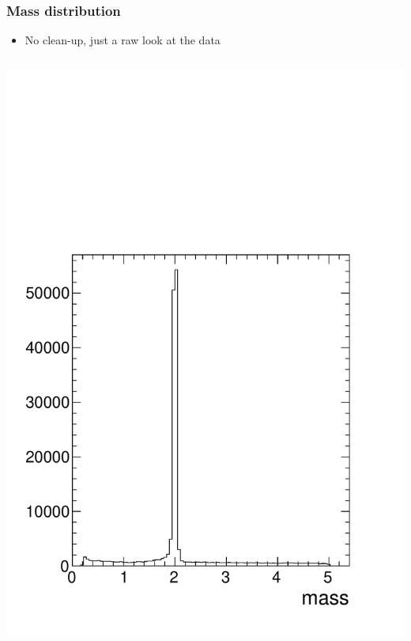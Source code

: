 \documentclass[compress]{beamer}
\begin{document}
\begin{frame}
\frametitle{Mass distribution}

\begin{itemize}
\item No clean-up, just a raw look at the data
\end{itemize}

\begin{columns}
\includegraphics[width=\linewidth]{mass.pdf}

\end{columns}
\end{frame}
\end{document}
